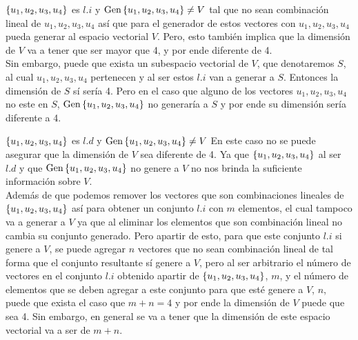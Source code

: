 \begin{enumerate}[label=\listAlph]
\begin{mathcase}{\(\left\{ u_1, u_2, u_3, u_4 \right\}\) es \(l.i\) y \(\text{Gen} \left\{ u_1, u_2, u_3, u_4 \right\} \neq V\)}
                tal que no sean combinación lineal de \(u_1, u_2, u_3, u_4\) así que para el generador de estos vectores con \(u_1, u_2, u_3, u_4\) pueda 
                generar al espacio vectorial \(V\). Pero, esto también implica que la dimensión de \(V\) va a tener que ser mayor que 4, y por ende diferente de 4.
                \\
                Sin embargo, puede que exista un subespacio vectorial de \(V\), que denotaremos \(S\), al cual \(u_1, u_2, u_3, u_4\) pertenecen y al ser estos \(l.i\)
                van a generar a \(S\). Entonces la dimensión de \(S\) sí sería 4. 
                Pero en el caso que alguno de los vectores \(u_1, u_2, u_3, u_4\) no este en \(S\), \(\text{Gen} \left\{ u_1, u_2, u_3, u_4 \right\}\) no generaría a \(S\) y por ende su dimensión sería diferente a 4.
            \end{mathcase}
            \begin{mathcase}{\(\left\{ u_1, u_2, u_3, u_4 \right\}\) es \(l.d\) y \(\text{Gen} \left\{ u_1, u_2, u_3, u_4 \right\} \neq V\)}
                En este caso no se puede asegurar que la dimensión de \(V\) sea diferente de 4. 
                Ya que \(\left\{ u_1, u_2, u_3, u_4 \right\}\) al ser \(l.d\) y que \(\text{Gen} \left\{ u_1, u_2, u_3, u_4 \right\}\) no genere a \(V\) no nos brinda la suficiente información sobre \(V\). \\
                Además de que podemos remover los vectores que son combinaciones lineales de \(\left\{ u_1, u_2, u_3, u_4 \right\}\) 
                así para obtener un conjunto \(l.i\) con \(m\) elementos, el cual tampoco va a generar a \(V\) ya que al eliminar los elementos que son combinación lineal no cambia su conjunto generado.
                Pero apartir de esto, para que este conjunto \(l.i\) si genere a \(V\), se puede agregar \(n\) vectores que no sean combinación lineal de tal forma que 
                el conjunto resultante sí genere a \(V\), pero al ser arbitrario el número de vectores en el conjunto \(l.i\) obtenido apartir de \(\left\{ u_1, u_2, u_3, u_4 \right\}\), \(m\),
                y el número de elementos que se deben agregar a este conjunto para que esté genere a \(V\), \(n\), puede que exista el caso que \(m + n = 4\)
                y por ende la dimensión de \(V\) puede que sea 4. Sin embargo, en general se va a tener que la dimensión de este espacio vectorial va a ser de \(m + n\).
            \end{mathcase}

\end{enumerate}
